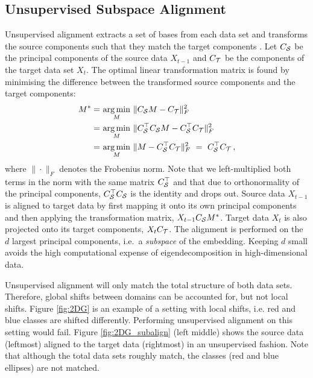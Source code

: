 \documentclass[letterpaper]{article} %
\begin{document}
\subsection{Unsupervised Subspace Alignment}
Unsupervised alignment extracts a set of bases from each data set and transforms the source components such that they match the target components \cite{fernando2013unsupervised}. Let $C_{\cal S}$ be the principal components of the source data $X_{t-1}$ and $C_{\cal T}$ be the components of the target data set $X_t$. The optimal linear transformation matrix is found by minimising the difference between the transformed source components and the target components:
\begin{align}
    M^{*} =& \ \underset{M}{\arg \min} \ \| C_{\cal S}M - C_{\cal T}\|^{2}_{F} \nonumber \\
    =& \ \underset{M}{\arg \min} \ \| C_{\cal S}^{\top} C_{\cal S}M - C_{\cal S}^{\top}C_{\cal T}\|^{2}_{F} \nonumber \\
    =& \ \underset{M}{\arg \min} \ \| M - C_{\cal S}^{\top}C_{\cal T}\|^{2}_{F} \ = \ C_{\cal S}^{\top} C_{\cal T} \label{eq:unsup_align} \, ,
\end{align}
where $\| \cdot \|_{F}$ denotes the Frobenius norm. Note that we left-multiplied both terms in the norm with the same matrix $C_{\cal S}^{\top}$ and that due to orthonormality of the principal components, $C_{\cal S}^{\top} C_{\cal S}$ is the identity and drops out.
Source data $X_{t-1}$ is aligned to target data by first mapping it onto its own principal components and then applying the transformation matrix, $X_{t-1} C_{\cal S} M^{*}$. Target data $X_t$ is also projected onto its target components, $X_t C_{\cal T}$.
The alignment is performed on the $d$ largest principal components, i.e.~a \emph{subspace} of the embedding. Keeping $d$ small avoids the high computational expense of eigendecomposition in high-dimensional data.

Unsupervised alignment will only match the total structure of both data sets. Therefore, global shifts between domains can be accounted for, but not local shifts. Figure \ref{fig:2DG} is an example of a setting with local shifts, i.e. red and blue classes are shifted differently. Performing unsupervised alignment on this setting would fail. Figure  \ref{fig:2DG_subalign} (left middle) shows the source data (leftmost) aligned to the target data (rightmost) in an unsupervised fashion. Note that although the total data sets roughly match, the classes (red and blue ellipses) are not matched.
\end{document}
